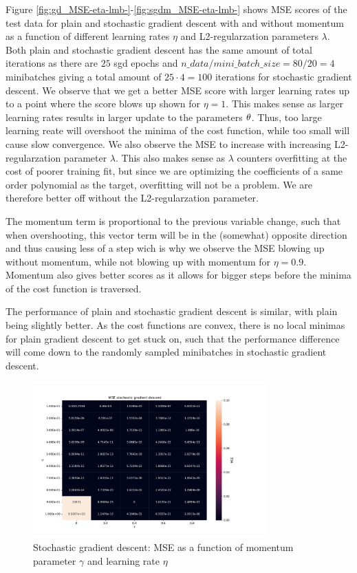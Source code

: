 Figure \ref{fig:gd_MSE-eta-lmb-}-\ref{fig:sgdm_MSE-eta-lmb-} shows MSE scores of the test data for 
plain and stochastic gradient descent with and without momentum as a function of
different learning rates \(\eta \) and L2-regularzation parameters \(\lambda \). Both plain and 
stochastic gradient descent has the same amount of total iterations as there are $25$ sgd epochs 
and $n\_data/mini\_batch\_size=80/20=4$ minibatches giving a total amount of $25 \cdot 4 = 100$ 
iterations for stochastic gradient descent. We observe that we get a better MSE score with larger 
learning rates up to a point where the score blows up shown for $\eta=1$. This makes sense as larger 
learning rates results in larger update to the parameters $\bf{\theta } $. Thus, too large learning reate 
will overshoot the minima of the cost function, while too small will cause slow convergence.  
We also observe the MSE to increase with increasing L2-regularzation parameter $\lambda $. This also 
makes sense as $\lambda $ counters overfitting at the cost of poorer training fit, but since we are 
optimizing the coefficients of a same order polynomial as the target, overfitting will not be a problem.
We are therefore better off without the L2-regularzation parameter. 

The momentum 
term is proportional to the previous variable change, such that when overshooting, this vector term will be in the 
(somewhat) opposite direction and thus causing less of a step wich is why we observe the MSE blowing up without momentum,
while not blowing up with momentum for $\eta =0.9$. Momentum also gives better scores as it allows for bigger steps
before the minima of the cost function is traversed. 

The performance of plain and stochastic gradient descent is similar, with plain being slightly better. As the 
cost functions are convex, there is no local minimas for plain gradient descent to get stuck on, such that the 
performance difference will come down to the randomly sampled minibatches in stochastic gradient descent. 



\begin{figure}[H]
\centering
\includegraphics[width=0.8\textwidth]{Figures/PartA/_sgdm_MSE(eta,momentum)}
\caption{Stochastic gradient descent: MSE as a function of momentum parameter
    $\gamma$  and learning rate \(\eta \)	 }
\label{fig:_sgdm_MSE-eta-momentum-}
\end{figure}


